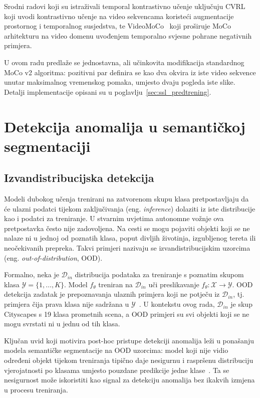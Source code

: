 \documentclass[diplomskirad]{fer}
\begin{document}
Srodni radovi koji su istraživali temporal kontrastivno učenje uključuju CVRL~\cite{cvrl2021} koji uvodi kontrastivno učenje na video sekvencama koristeći augmentacije prostornog i temporalnog susjedstva, te VideoMoCo~\cite{pan2021videomoco} koji proširuje MoCo arhitekturu na video domenu uvođenjem temporalno svjesne pohrane negativnih primjera.

U ovom radu predlaže se jednostavna, ali učinkovita modifikacija standardnog MoCo v2 algoritma: pozitivni par definira se kao dva okvira iz iste video sekvence unutar maksimalnog vremenskog pomaka, umjesto dvaju pogleda iste slike. Detalji implementacije opisani su u poglavlju~\ref{sec:ssl_predtrening}.




\section{Detekcija anomalija u semantičkoj segmentaciji}
\label{sec:anomaly_detection}

\subsection{Izvandistribucijska detekcija}

Modeli dubokog učenja trenirani na zatvorenom skupu klasa pretpostavljaju da će ulazni podatci tijekom zaključivanja (eng. \textit{inference}) dolaziti iz iste distribucije kao i podatci za treniranje. U stvarnim uvjetima autonomne vožnje ova pretpostavka često nije zadovoljena. Na cesti se mogu pojaviti objekti koji se ne nalaze ni u jednoj od poznatih klasa, poput divljih životinja, izgubljenog tereta ili neočekivanih prepreka. Takvi primjeri nazivaju se izvandistribucijskim uzorcima (eng. \textit{out-of-distribution}, OOD).

Formalno, neka je $\mathcal{D}_{in}$ distribucija podataka za treniranje s poznatim skupom klasa $\mathcal{Y} = \{1, \ldots, K\}$. Model $f_\theta$ treniran na $\mathcal{D}_{in}$ uči preslikavanje $f_\theta: \mathcal{X} \rightarrow \mathcal{Y}$. OOD detekcija zadatak je prepoznavanja ulaznih primjera koji ne potječu iz $\mathcal{D}_{in}$, tj. primjera čija prava klasa nije sadržana u $\mathcal{Y}$~\cite{chan2021segmentmeifyoucanbenchmarkanomalysegmentation}. U kontekstu ovog rada, $\mathcal{D}_{in}$ je skup Cityscapes s 19 klasa prometnih scena, a OOD primjeri su svi objekti koji se ne mogu svrstati ni u jednu od tih klasa.

Ključan uvid koji motivira post-hoc pristupe detekciji anomalija leži u ponašanju modela semantičke segmentacije na OOD uzorcima: model koji nije vidio određeni objekt tijekom treniranja tipično daje nesigurnu i raspršenu distribuciju vjerojatnosti po klasama umjesto pouzdane predikcije jedne klase~\cite{hendrycks2017baseline}. Ta se nesigurnost može iskoristiti kao signal za detekciju anomalija bez ikakvih izmjena u procesu treniranja.
\end{document}
